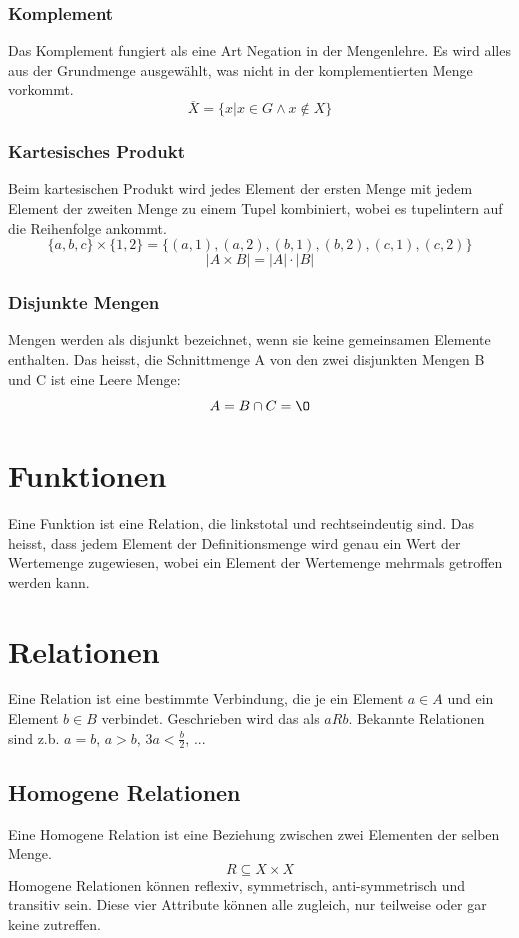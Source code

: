 \documentclass{article}
\begin{document}
\subsubsection{Komplement}
Das Komplement fungiert als eine Art Negation in der Mengenlehre. Es wird alles aus der Grundmenge ausgewählt, was nicht in der komplementierten Menge vorkommt.
\[
		\overline{X} = \{x | x \in G \land x \notin X\}
\]
\subsubsection{Kartesisches Produkt}
Beim kartesischen Produkt wird jedes Element der ersten Menge mit jedem Element der zweiten Menge zu einem Tupel kombiniert, wobei es tupelintern auf die Reihenfolge ankommt.
\[
		\{a,b,c\} \times \{1,2\} = \{(a,1), (a,2), (b,1), (b,2), (c,1), (c,2)\}
\]
\[
|A \times B| = |A| \cdot |B|
\]
\subsubsection{Disjunkte Mengen}
Mengen werden als disjunkt bezeichnet, wenn sie keine gemeinsamen Elemente enthalten. Das heisst, die Schnittmenge A von den zwei disjunkten Mengen B und C ist eine Leere Menge:
\[
A = B\cap C = \O
\]

\section{Funktionen}
Eine Funktion ist eine Relation, die linkstotal und rechtseindeutig sind. Das heisst, dass jedem Element der Definitionsmenge wird genau ein Wert der Wertemenge zugewiesen, wobei ein Element der Wertemenge mehrmals getroffen werden kann.
\section{Relationen}
Eine Relation ist eine bestimmte Verbindung, die je ein Element \(a \in A\) und ein Element \(b \in B\) verbindet. Geschrieben wird das als \(aRb\). Bekannte Relationen sind z.b. \(a=b\), \(a>b\), \(3a< \frac{b}{2}\), ...

\subsection{Homogene Relationen}
Eine Homogene Relation ist eine Beziehung zwischen zwei Elementen der selben Menge.
$$R \subseteq X \times X$$
Homogene Relationen können reflexiv, symmetrisch, anti-symmetrisch und transitiv sein. Diese vier Attribute können alle zugleich, nur teilweise oder gar keine zutreffen.
\end{document}
